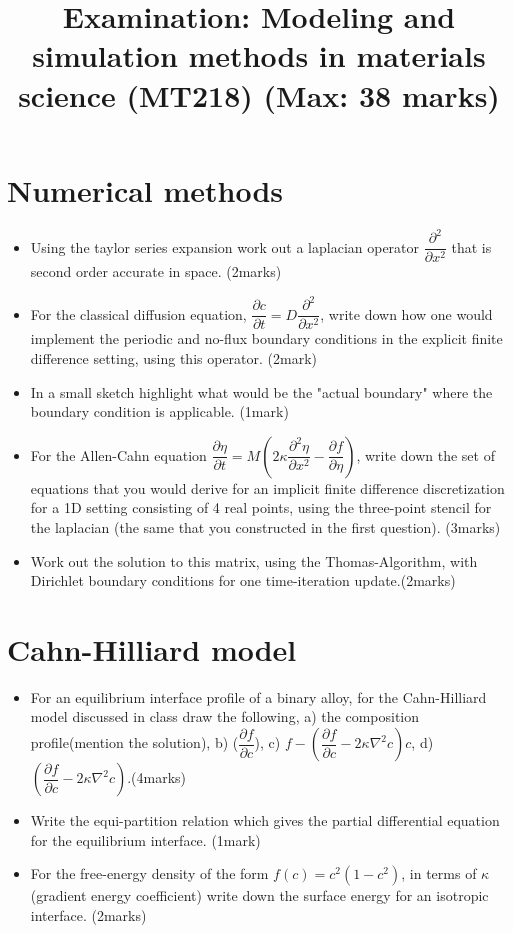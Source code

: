 \documentclass[a4paper,10pt]{article}
\title{Examination: Modeling and simulation methods in materials science (MT218) (Max: 38 marks)}
\author{}
\begin{document}
\maketitle

\section{Numerical methods}
\begin{itemize}
 \item Using the taylor series expansion work out a laplacian operator $\dfrac{\partial ^{2}}{\partial x^{2}}$ 
 that is second order accurate in space. (2marks)
 \item For the classical diffusion equation, $\dfrac{\partial c}{\partial t} = D\dfrac{\partial ^{2}}{\partial x^{2}}$,
 write down how one would implement the periodic and no-flux boundary conditions in the explicit
 finite difference setting, using this operator. (2mark)
 \item In a small sketch highlight what would be the "actual boundary" where the boundary condition is applicable. (1mark)
\end{itemize}

\begin{itemize}
 \item For the Allen-Cahn equation $\dfrac{\partial \eta}{\partial t} 
 = M\left(2\kappa \dfrac{\partial^{2}\eta}{\partial x^{2}} - \dfrac{\partial f}{\partial \eta}\right)$, write down
 the set of equations that you would derive for an implicit finite difference discretization for a 1D setting
 consisting of 4 real points, using the three-point stencil for the laplacian (the same that you constructed 
 in the first question). (3marks)
 \item Work out the solution to this matrix, using the Thomas-Algorithm, with Dirichlet boundary conditions 
 for one time-iteration update.(2marks)
\end{itemize}

\section{Cahn-Hilliard model}
\begin{itemize}
 \item For an equilibrium interface profile of a binary alloy, for the Cahn-Hilliard model discussed in class
 draw the following, a) the composition profile(mention the solution), b) ($\dfrac{\partial f}{\partial c}$),
 c) $f-\left(\dfrac{\partial f}{\partial c} - 2\kappa \nabla^{2}c\right)c$, d) 
 $\left(\dfrac{\partial f}{\partial c} - 2\kappa \nabla^{2}c\right)$.(4marks)
 \item Write the equi-partition relation which gives the partial differential equation for the equilibrium interface. (1mark)
 \item For the free-energy density of the form $f(c)=c^{2}\left(1-c^{2}\right)$, in terms of $\kappa$ (gradient energy coefficient) 
 write down the surface energy for an isotropic interface. (2marks)
\end{itemize}
\end{document}
